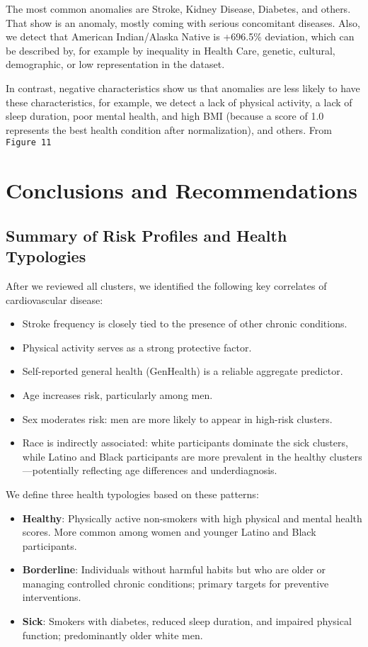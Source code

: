 \documentclass[12pt, a4paper]{article}
\begin{document}
The most common anomalies are Stroke, Kidney Disease,  Diabetes, and others. That show is an anomaly, mostly coming with serious concomitant diseases. Also, we detect that American Indian/Alaska Native is +696.5\% deviation, which can be described by, for example by inequality in Health Care, genetic, cultural, demographic, or low representation in the dataset. 

In contrast, negative characteristics show us that anomalies are less likely to have these characteristics, for example, we detect a lack of physical activity, a lack of sleep duration, poor mental health, and high BMI (because a score of 1.0 represents the best health condition after normalization), and others. 
From \texttt{Figure 11} 

\section{Conclusions and Recommendations}

\subsection*{Summary of Risk Profiles and Health Typologies}
\hspace*{1em}
After we reviewed all clusters, we identified the following key correlates of cardiovascular disease:
\begin{itemize}
  \item Stroke frequency is closely tied to the presence of other chronic conditions.
  \item Physical activity serves as a strong protective factor.
  \item Self-reported general health (GenHealth) is a reliable aggregate predictor.
  \item Age increases risk, particularly among men.
  \item Sex moderates risk: men are more likely to appear in high-risk clusters.
  \item Race is indirectly associated: white participants dominate the sick clusters, while Latino and Black participants are more prevalent in the healthy clusters—potentially reflecting age differences and underdiagnosis.
\end{itemize}

We define three health typologies based on these patterns:
\begin{itemize}
  \item \textbf{Healthy}: Physically active non-smokers with high physical and mental health scores. More common among women and younger Latino and Black participants.
  \item \textbf{Borderline}: Individuals without harmful habits but who are older or managing controlled chronic conditions; primary targets for preventive interventions.
  \item \textbf{Sick}: Smokers with diabetes, reduced sleep duration, and impaired physical function; predominantly older white men.
\end{itemize}
\end{document}
